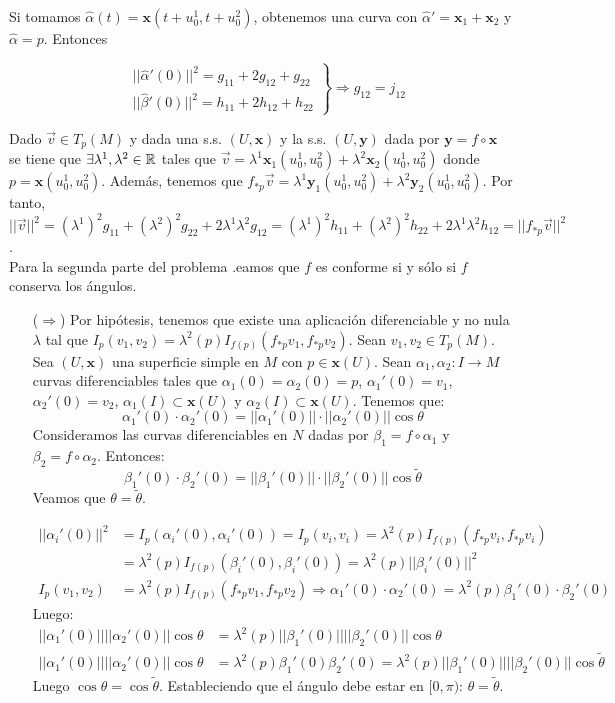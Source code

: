 \documentclass[twoside]{article}
\newcommand{\x}{{\mathbf{x}}}
\newcommand{\y}{{\mathbf{y}}}
\begin{document}
\begin{solucion}
Si tomamos $\hat{\alpha}(t)=\x(t+u_0^1,t+u_0^2)$, obtenemos una curva con $\hat{\alpha}'=\x_1+\x_2$ y $\hat{\alpha}=p$. Entonces

\[
\left.
\begin{matrix}
&||\hat{\alpha}'(0)||^2=g_{11}+2g_{12}+g_{22}\\
&||\hat{\beta}'(0)||^2=h_{11}+2h_{12}+h_{22}
\end{matrix}\right\}\Rightarrow g_{12}=j_{12}
\]

Dado $\vec{v}\in T_p(M)$ y dada una s.s. $(U,\x)$ y la s.s. $(U,\y)$ dada por $\y=f\circ\x$ se tiene que $\exists\lambda^1,\lambda^2\in\mathbb{R}$ tales que $\vec{v}=\lambda^1\x_1(u_0^1,u_0^2)+\lambda^2\x_2(u_0^1,u_0^2)$ donde $p=\x(u_0^1,u_0^2)$. Además, tenemos que $f_{*p}\vec{v}=\lambda^1\y_1(u_0^1,u_0^2)+\lambda^2\y_2(u_0^1,u_0^2)$. Por tanto, $||\vec{v}||^2=(\lambda^1)^2g_{11}+(\lambda^2)^2g_{22}+2\lambda^1\lambda^2g_{12}=(\lambda^1)^2h_{11}+(\lambda^2)^2h_{22}+2\lambda^1\lambda^2 h_{12}=||f_{*p}\vec{v}||^2$. \\

Para la segunda parte del problema .eamos que $f$ es conforme si y sólo si $f$ conserva los ángulos. 
\begin{itemize}

\item[($\Rightarrow$)] Por hipótesis, tenemos que existe una aplicación diferenciable y no nula $λ$ tal que $I_p(v_1,v_2)=λ^2(p) I_{f(p)}(f_{*p}v_1,f_{*p}v_2)$. Sean $v_1, v_2 \in T_p(M)$. Sea $(U,\x)$ una superficie simple en $M$ con $p \in \x(U)$. Sean $α_1,α_2 : I \to M$ curvas diferenciables tales que $α_1(0)=α_2(0)=p$, $α_1'(0)=v_1$, $α_2'(0)=v_2$, $α_1(I) \subset \x(U)$ y $α_2(I) \subset \x(U)$. Tenemos que:
\[ α_1'(0) \cdot α_2'(0) = ||α_1'(0)|| \cdot ||α_2'(0)|| \cos θ \]
Consideramos las curvas diferenciables en $N$ dadas por $β_1 = f \circ α_1$ y $β_2=f\circ α_2$. Entonces:
\[ β_1'(0)\cdot β_2'(0) = ||β_1'(0)|| \cdot ||β_2'(0)|| \cos \tilde{θ} \]
Veamos que $θ = \tilde{θ}$.

\begin{align*}
	||α_i'(0)||^2 & = I_p(α_i'(0),α_i'(0)) = I_p(v_i,v_i) = λ^2(p) I_{f(p)} (f_{*p}v_i,f_{*p}v_i)\\
	& = λ^2(p) I_{f(p)} (β_i'(0),β_i'(0)) = λ^2(p)||β_i'(0)||^2\\
	I_p(v_1,v_2) & = λ^2(p)I_{f(p)} (f_{*p}v_1,f_{*p}v_2) \Rightarrow α_1'(0) \cdot α_2'(0) = λ^2(p) β_1'(0) \cdot β_2'(0)
\end{align*}
Luego:
\begin{align*}
	||α_1'(0)|| ||α_2'(0)|| \cos θ & = λ^2(p) ||β_1'(0)|| ||β_2'(0)|| \cos θ\\
	||α_1'(0)|| ||α_2'(0)|| \cos θ & = λ^2(p) β_1'(0) β_2'(0) = λ^2(p) ||β_1'(0)|| ||β_2'(0)|| \cos \tilde{θ}
\end{align*}
Luego $\cos θ = \cos \tilde{θ}$. Estableciendo que el ángulo debe estar en $[0,π)$: $θ = \tilde{θ}$.


\end{itemize}
\end{solucion}
\end{document}
